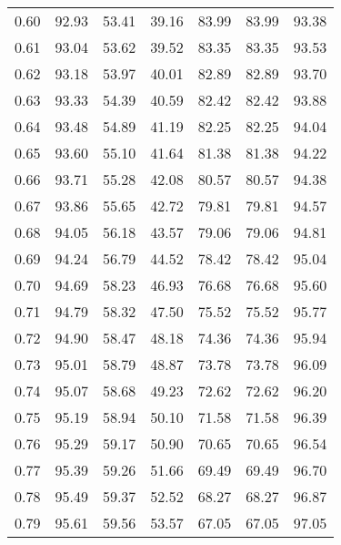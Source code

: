 \begin{tabular}{|c|c|c|c|c|c|c|}
      0.60 &     92.93 &     53.41 &      39.16 &   83.99 &      83.99 &         93.38 \\
      0.61 &     93.04 &     53.62 &      39.52 &   83.35 &      83.35 &         93.53 \\
      0.62 &     93.18 &     53.97 &      40.01 &   82.89 &      82.89 &         93.70 \\
      0.63 &     93.33 &     54.39 &      40.59 &   82.42 &      82.42 &         93.88 \\
      0.64 &     93.48 &     54.89 &      41.19 &   82.25 &      82.25 &         94.04 \\
      0.65 &     93.60 &     55.10 &      41.64 &   81.38 &      81.38 &         94.22 \\
      0.66 &     93.71 &     55.28 &      42.08 &   80.57 &      80.57 &         94.38 \\
      0.67 &     93.86 &     55.65 &      42.72 &   79.81 &      79.81 &         94.57 \\
      0.68 &     94.05 &     56.18 &      43.57 &   79.06 &      79.06 &         94.81 \\
      0.69 &     94.24 &     56.79 &      44.52 &   78.42 &      78.42 &         95.04 \\
      0.70 &     94.69 &     58.23 &      46.93 &   76.68 &      76.68 &         95.60 \\
      0.71 &     94.79 &     58.32 &      47.50 &   75.52 &      75.52 &         95.77 \\
      0.72 &     94.90 &     58.47 &      48.18 &   74.36 &      74.36 &         95.94 \\
      0.73 &     95.01 &     58.79 &      48.87 &   73.78 &      73.78 &         96.09 \\
      0.74 &     95.07 &     58.68 &      49.23 &   72.62 &      72.62 &         96.20 \\
      0.75 &     95.19 &     58.94 &      50.10 &   71.58 &      71.58 &         96.39 \\
      0.76 &     95.29 &     59.17 &      50.90 &   70.65 &      70.65 &         96.54 \\
      0.77 &     95.39 &     59.26 &      51.66 &   69.49 &      69.49 &         96.70 \\
      0.78 &     95.49 &     59.37 &      52.52 &   68.27 &      68.27 &         96.87 \\
      0.79 &     95.61 &     59.56 &      53.57 &   67.05 &      67.05 &         97.05 \\

\end{tabular}
